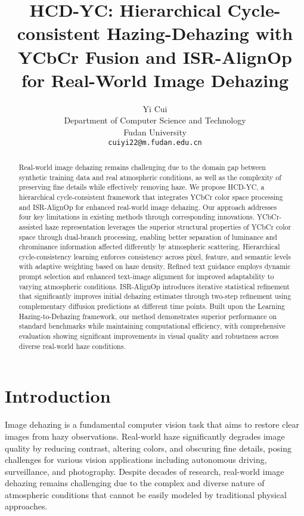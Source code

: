 \documentclass{article}
\title{HCD-YC: Hierarchical Cycle-consistent Hazing-Dehazing with YCbCr Fusion and ISR-AlignOp for Real-World Image Dehazing}
\author{%
  Yi Cui \\
  Department of Computer Science and Technology \\
  Fudan University \\
  \texttt{cuiyi22@m.fudan.edu.cn} \\
}
\begin{document}
\maketitle


\begin{abstract}
Real-world image dehazing remains challenging due to the domain gap between synthetic training data and real atmospheric conditions, as well as the complexity of preserving fine details while effectively removing haze. We propose HCD-YC, a hierarchical cycle-consistent framework that integrates YCbCr color space processing and ISR-AlignOp for enhanced real-world image dehazing. Our approach addresses four key limitations in existing methods through corresponding innovations. YCbCr-assisted haze representation leverages the superior structural properties of YCbCr color space through dual-branch processing, enabling better separation of luminance and chrominance information affected differently by atmospheric scattering. Hierarchical cycle-consistency learning enforces consistency across pixel, feature, and semantic levels with adaptive weighting based on haze density. Refined text guidance employs dynamic prompt selection and enhanced text-image alignment for improved adaptability to varying atmospheric conditions. ISR-AlignOp introduces iterative statistical refinement that significantly improves initial dehazing estimates through two-step refinement using complementary diffusion predictions at different time points. Built upon the Learning Hazing-to-Dehazing framework, our method demonstrates superior performance on standard benchmarks while maintaining computational efficiency, with comprehensive evaluation showing significant improvements in visual quality and robustness across diverse real-world haze conditions.
\end{abstract}


\section{Introduction}

Image dehazing is a fundamental computer vision task that aims to restore clear images from hazy observations. Real-world haze significantly degrades image quality by reducing contrast, altering colors, and obscuring fine details, posing challenges for various vision applications including autonomous driving, surveillance, and photography. Despite decades of research, real-world image dehazing remains challenging due to the complex and diverse nature of atmospheric conditions that cannot be easily modeled by traditional physical approaches.
\end{document}
